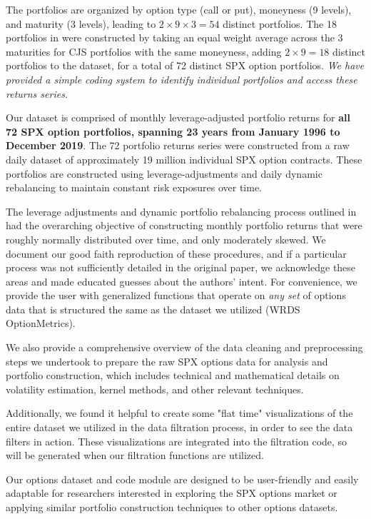 \documentclass{article}
\begin{document}
The \citet{Constantinides2013} portfolios are organized by option type (call or put), moneyness (9 levels), and maturity (3 levels), leading to $2 \times 9 \times 3 = 54$ distinct portfolios. The 18 portfolios in \citet{He2017} were constructed by taking an equal weight average across the 3 maturities for CJS portfolios with the same moneyness, adding $2 \times 9 = 18$ distinct portfolios to the dataset, for a total of 72 distinct SPX option portfolios. \emph{We have provided a simple coding system to identify individual portfolios and access these returns series.}

Our dataset is comprised of monthly leverage-adjusted portfolio returns for \textbf{all 72 SPX option portfolios, spanning 23 years from January 1996 to December 2019}. The 72 portfolio returns series were constructed from a raw daily dataset of approximately 19 million individual SPX option contracts. These portfolios are constructed using leverage-adjustments and daily dynamic rebalancing to maintain constant risk exposures over time.


The leverage adjustments and dynamic portfolio rebalancing process outlined in \citet{Constantinides2013} had the overarching objective of constructing monthly portfolio returns that were roughly normally distributed over time, and only moderately skewed. We document our good faith reproduction of these procedures, and if a particular process was not sufficiently detailed in the original paper, we acknowledge these areas and made educated guesses about the authors' intent. For convenience, we provide the user with generalized functions that operate on \emph{any set} of options data that is structured the same as the dataset we utilized (WRDS OptionMetrics). 

We also provide a comprehensive overview of the data cleaning and preprocessing steps we undertook to prepare the raw SPX options data for analysis and portfolio construction, which includes technical and mathematical details on volatility estimation, kernel methods, and other relevant techniques.

Additionally, we found it helpful to create some "flat time" visualizations of the entire dataset we utilized in the data filtration process, in order to see the data filters in action. These visualizations are integrated into the filtration code, so will be generated when our filtration functions are utilized.

Our options dataset and code module are designed to be user-friendly and easily adaptable for researchers interested in exploring the SPX options market or applying similar portfolio construction techniques to other options datasets. 
\end{document}
